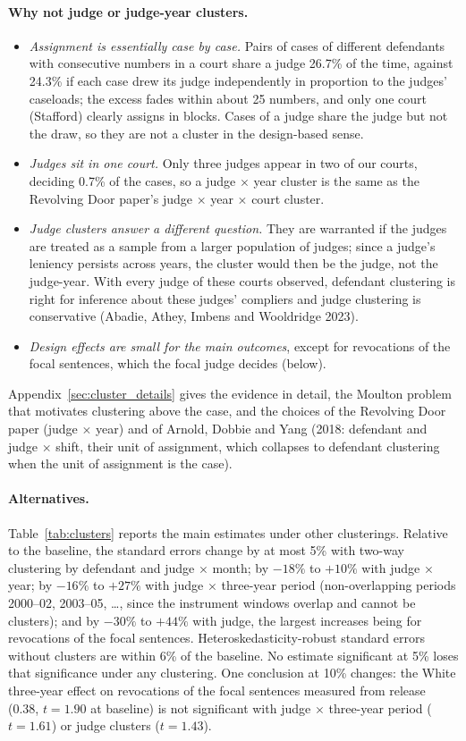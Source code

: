 \documentclass[11pt]{article}
\begin{document}
\paragraph{Why not judge or judge-year clusters.}
\begin{itemize}
  \item \emph{Assignment is essentially case by case.} Pairs of cases of different defendants with consecutive numbers in a court share a judge 26.7\% of the time, against 24.3\% if each case drew its judge independently in proportion to the judges' caseloads; the excess fades within about 25 numbers, and only one court (Stafford) clearly assigns in blocks. Cases of a judge share the judge but not the draw, so they are not a cluster in the design-based sense.
  \item \emph{Judges sit in one court.} Only three judges appear in two of our courts, deciding 0.7\% of the cases, so a judge $\times$ year cluster is the same as the Revolving Door paper's judge $\times$ year $\times$ court cluster.
  \item \emph{Judge clusters answer a different question.} They are warranted if the judges are treated as a sample from a larger population of judges; since a judge's leniency persists across years, the cluster would then be the judge, not the judge-year. With every judge of these courts observed, defendant clustering is right for inference about these judges' compliers and judge clustering is conservative (Abadie, Athey, Imbens and Wooldridge 2023).
  \item \emph{Design effects are small for the main outcomes}, except for revocations of the focal sentences, which the focal judge decides (below).
\end{itemize}
Appendix~\ref{sec:cluster_details} gives the evidence in detail, the Moulton problem that motivates clustering above the case, and the choices of the Revolving Door paper (judge $\times$ year) and of Arnold, Dobbie and Yang (2018: defendant and judge $\times$ shift, their unit of assignment, which collapses to defendant clustering when the unit of assignment is the case).

\paragraph{Alternatives.} Table~\ref{tab:clusters} reports the main estimates under other clusterings. Relative to the baseline, the standard errors change by at most 5\% with two-way clustering by defendant and judge $\times$ month; by $-18\%$ to $+10\%$ with judge $\times$ year; by $-16\%$ to $+27\%$ with judge $\times$ three-year period (non-overlapping periods 2000--02, 2003--05, \ldots, since the instrument windows overlap and cannot be clusters); and by $-30\%$ to $+44\%$ with judge, the largest increases being for revocations of the focal sentences. Heteroskedasticity-robust standard errors without clusters are within 6\% of the baseline. No estimate significant at 5\% loses that significance under any clustering. One conclusion at 10\% changes: the White three-year effect on revocations of the focal sentences measured from release (0.38, $t = 1.90$ at baseline) is not significant with judge $\times$ three-year period ($t = 1.61$) or judge clusters ($t = 1.43$).
\end{document}
